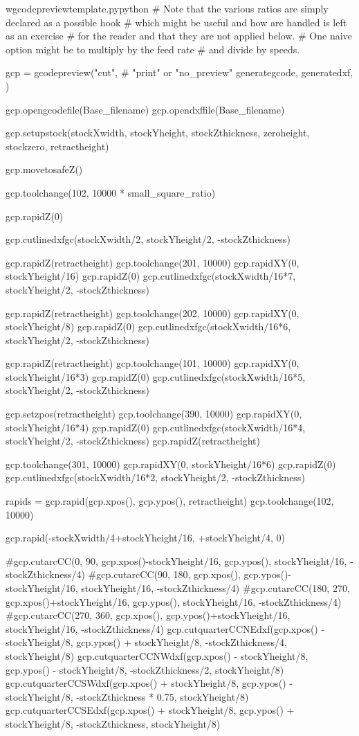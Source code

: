 \documentclass{ltxdoc}
\begin{document}
\begin{writecode}{w}{gcodepreviewtemplate.py}{python}
# Note that the various ratios are simply declared as a possible hook
# which might be useful and how are handled is left as an exercise 
# for the reader and that they are not applied below.
# One naive option might be to multiply by the feed rate 
# and divide by speeds.

gcp = gcodepreview("cut", # "print" or "no_preview"
                   generategcode,
                   generatedxf,
                   )

gcp.opengcodefile(Base_filename)
gcp.opendxffile(Base_filename)

gcp.setupstock(stockXwidth, stockYheight, stockZthickness, zeroheight, stockzero, retractheight)

gcp.movetosafeZ()

gcp.toolchange(102, 10000 * small_square_ratio)

gcp.rapidZ(0)

gcp.cutlinedxfgc(stockXwidth/2, stockYheight/2, -stockZthickness)

gcp.rapidZ(retractheight)
gcp.toolchange(201, 10000)
gcp.rapidXY(0, stockYheight/16)
gcp.rapidZ(0)
gcp.cutlinedxfgc(stockXwidth/16*7, stockYheight/2, -stockZthickness)

gcp.rapidZ(retractheight)
gcp.toolchange(202, 10000)
gcp.rapidXY(0, stockYheight/8)
gcp.rapidZ(0)
gcp.cutlinedxfgc(stockXwidth/16*6, stockYheight/2, -stockZthickness)

gcp.rapidZ(retractheight)
gcp.toolchange(101, 10000)
gcp.rapidXY(0, stockYheight/16*3)
gcp.rapidZ(0)
gcp.cutlinedxfgc(stockXwidth/16*5, stockYheight/2, -stockZthickness)

gcp.setzpos(retractheight)
gcp.toolchange(390, 10000)
gcp.rapidXY(0, stockYheight/16*4)
gcp.rapidZ(0)
gcp.cutlinedxfgc(stockXwidth/16*4, stockYheight/2, -stockZthickness)
gcp.rapidZ(retractheight)

gcp.toolchange(301, 10000)
gcp.rapidXY(0, stockYheight/16*6)
gcp.rapidZ(0)
gcp.cutlinedxfgc(stockXwidth/16*2, stockYheight/2, -stockZthickness)

rapids = gcp.rapid(gcp.xpos(), gcp.ypos(), retractheight)
gcp.toolchange(102, 10000)

gcp.rapid(-stockXwidth/4+stockYheight/16, +stockYheight/4, 0)

#gcp.cutarcCC(0, 90, gcp.xpos()-stockYheight/16, gcp.ypos(), stockYheight/16, -stockZthickness/4)
#gcp.cutarcCC(90, 180, gcp.xpos(), gcp.ypos()-stockYheight/16, stockYheight/16, -stockZthickness/4)
#gcp.cutarcCC(180, 270, gcp.xpos()+stockYheight/16, gcp.ypos(), stockYheight/16, -stockZthickness/4)
#gcp.cutarcCC(270, 360, gcp.xpos(), gcp.ypos()+stockYheight/16, stockYheight/16, -stockZthickness/4)
gcp.cutquarterCCNEdxf(gcp.xpos() - stockYheight/8, gcp.ypos() + stockYheight/8, -stockZthickness/4, stockYheight/8)
gcp.cutquarterCCNWdxf(gcp.xpos() - stockYheight/8, gcp.ypos() - stockYheight/8, -stockZthickness/2, stockYheight/8)
gcp.cutquarterCCSWdxf(gcp.xpos() + stockYheight/8, gcp.ypos() - stockYheight/8, -stockZthickness * 0.75, stockYheight/8)
gcp.cutquarterCCSEdxf(gcp.xpos() + stockYheight/8, gcp.ypos() + stockYheight/8, -stockZthickness, stockYheight/8)


\end{writecode}
\end{document}
